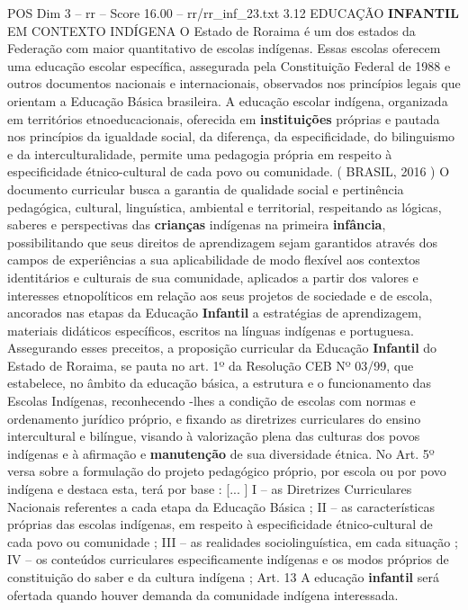 \begin{textsample}{POS Dim 3 – rr – Score 16.00 – rr/rr\_inf\_23.txt}  \label{ex:f3_pos_226}
3.12 EDUCAÇÃO \textbf{INFANTIL} EM CONTEXTO INDÍGENA O Estado de Roraima é um dos estados da Federação com maior quantitativo de escolas indígenas.
Essas escolas oferecem uma educação escolar específica, assegurada pela Constituição Federal de 1988 e outros documentos nacionais e internacionais, observados nos princípios legais que orientam a Educação Básica brasileira.
A educação escolar indígena, organizada em territórios etnoeducacionais, oferecida em \textbf{instituições} próprias e pautada nos princípios da igualdade social, da diferença, da especificidade, do bilinguismo e da interculturalidade, permite uma pedagogia própria em respeito à especificidade étnico-cultural de cada povo ou comunidade. ( BRASIL, 2016 ) O documento curricular busca a garantia de qualidade social e pertinência pedagógica, cultural, linguística, ambiental e territorial, respeitando as lógicas, saberes e perspectivas das \textbf{crianças} indígenas na primeira \textbf{infância}, possibilitando que seus direitos de aprendizagem sejam garantidos através dos campos de experiências a sua aplicabilidade de modo flexível aos contextos identitários e culturais de sua comunidade, aplicados a partir dos valores e interesses etnopolíticos em relação aos seus projetos de sociedade e de escola, ancorados nas etapas da Educação \textbf{Infantil} a estratégias de aprendizagem, materiais didáticos específicos, escritos na línguas indígenas e portuguesa.
Assegurando esses preceitos, a proposição curricular da Educação \textbf{Infantil} do Estado de Roraima, se pauta no art. 1º da Resolução CEB Nº 03/99, que estabelece, no âmbito da educação básica, a estrutura e o funcionamento das Escolas Indígenas, reconhecendo -lhes a condição de escolas com normas e ordenamento jurídico próprio, e fixando as diretrizes curriculares do ensino intercultural e bilíngue, visando à valorização plena das culturas dos povos indígenas e à afirmação e \textbf{manutenção} de sua diversidade étnica.
No Art. 5º versa sobre a formulação do projeto pedagógico próprio, por escola ou por povo indígena e destaca esta, terá por base : [... ] I – as Diretrizes Curriculares Nacionais referentes a cada etapa da Educação Básica ; II – as características próprias das escolas indígenas, em respeito à especificidade étnico-cultural de cada povo ou comunidade ; III – as realidades sociolinguística, em cada situação ; IV – os conteúdos curriculares especificamente indígenas e os modos próprios de constituição do saber e da cultura indígena ; Art. 13 A educação \textbf{infantil} será ofertada quando houver demanda da comunidade indígena interessada.

\end{textsample}
